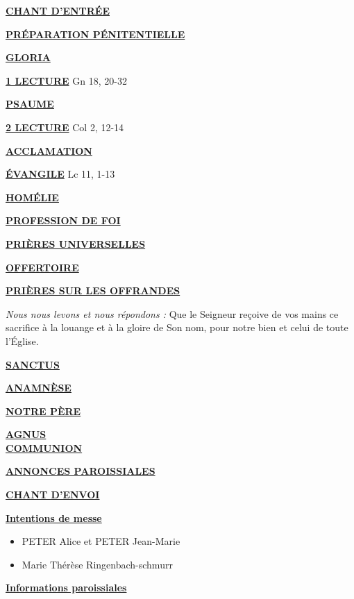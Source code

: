 \documentclass[french,11pt]{article}
\newcommand*{\chants}{../chants}
\newcommand*{\messe}{../messe_du_peuple_de_dieu}
\newcommand*{\pu}{../pu}
\newcommand*{\psaumes}{../psaumes}
\newcommand{\NewsItem}[1]{%
\vspace{3pt}
\underline{\textbf{#1}}
		  }
\begin{document}
\NewsItem{CHANT D'ENTRÉE}
	

\NewsItem{PRÉPARATION PÉNITENTIELLE}
	

\NewsItem{GLORIA}
	


\NewsItem{1\iere{} LECTURE} Gn 18, 20-32

\NewsItem{PSAUME}


\NewsItem{2\ieme{} LECTURE}  Col 2, 12-14

\NewsItem{ACCLAMATION}


\NewsItem{ÉVANGILE} Lc 11, 1-13

\NewsItem{HOMÉLIE}

\NewsItem{PROFESSION DE FOI}
%


\NewsItem{PRIÈRES UNIVERSELLES}


\NewsItem{OFFERTOIRE}

\NewsItem{PRIÈRES SUR LES OFFRANDES}
\textit{Nous nous levons et nous répondons : }
Que le Seigneur reçoive de vos mains ce sacrifice à la louange et à la gloire
de Son nom, pour notre bien et celui de toute l’Église.

\NewsItem{SANCTUS}


\NewsItem{ANAMNÈSE}


\NewsItem{NOTRE PÈRE}

\NewsItem{AGNUS} \\


\NewsItem{COMMUNION}


\NewsItem{ANNONCES PAROISSIALES}


\NewsItem{CHANT D'ENVOI}


\newpage


\NewsItem{Intentions de messe}
\begin{itemize}
\item[\Cross] PETER Alice et PETER Jean-Marie
\item[\Cross] Marie Thérèse Ringenbach-schmurr
\end{itemize}

\NewsItem{Informations paroissiales}
\end{document}
